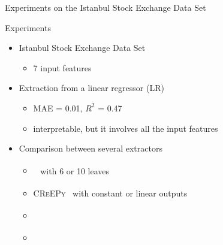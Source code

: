 \documentclass{beamer}
\newcommand{\tcite}[1]{\textsuperscript{\textcolor{Gold}{\tiny\cite{#1}}}}
\newcommand{\creepy}{\textsc{CReEPy}}
\begin{document}
\begin{frame}{Experiments on the Istanbul Stock Exchange Data Set}
	
	\begin{block}{Experiments}
		\medskip
		\begin{itemize}
			\item Istanbul Stock Exchange Data Set
			\begin{itemize}
				\item 7 input features
			\end{itemize}
			\smallskip
			\item Extraction from a linear regressor (LR)
			\begin{itemize}
				\item MAE = 0.01, $R^2$ = 0.47
				\item interpretable, but it involves all the input features
			\end{itemize}
			\smallskip
			\item Comparison between several extractors
			\begin{itemize}
				\item \cart{}~\tcite{breiman1984classification} with 6 or 10 leaves
				\item \creepy{}~\tcite{exact2023} with constant or linear outputs
				\item \gridex{}~\tcite{gridex-extraamas2021}
				\item \gridrex{}~\tcite{gridrex-kr2022}
			\end{itemize}
		\end{itemize}
		\medskip
	\end{block}
	
	\framebreak
	

\end{frame}
\end{document}

